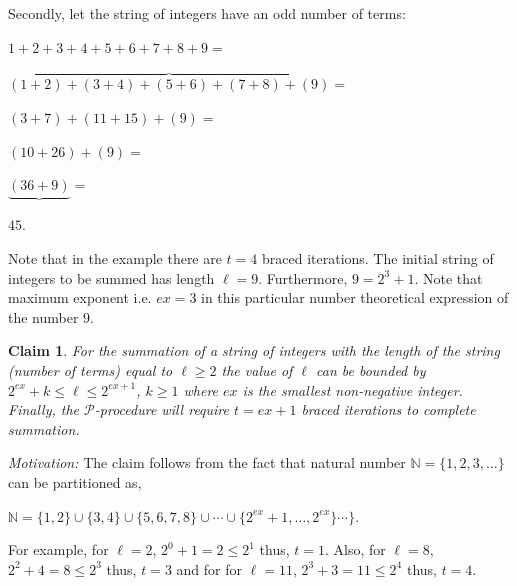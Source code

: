 \documentclass[12pt]{amsart}
\numberwithin{equation}{section}
\newtheorem{claim}[theorem]{Claim}
\numberwithin{equation}{section}
\begin{document}
Secondly, let the string of integers have an odd number of terms:
\begin{center}
$1+2+3+4+5+6+7+8+9 =$

$\overbrace{(1+2)+(3+4)+(5+6)+(7+8)+(9)} =$

$(3+7)+(11+15)+(9) =$

$(10+26)+(9) =$

$\underbrace{(36+9)} =$

$45$.
\end{center}
Note that in the example there are $t = 4$ braced iterations. The initial string of integers to be summed has length $\ell = 9$. Furthermore, $9 = 2^3 +1$. Note that maximum exponent i.e. $ex = 3$ in this particular number theoretical expression of the number $9$. 
\begin{claim}\label{clm5}
For the summation of a string of integers with the length of the string (number of terms) equal to $\ell \geq 2$ the value of $\ell$ can be bounded by $2^{ex} + k \leq \ell \leq 2^{ex+1}$, $k \geq 1$ where $ex$ is the smallest non-negative integer. Finally, the $\mathcal{P}$-procedure will require $t= ex + 1$ braced iterations to complete summation.
\end{claim}
\textit{Motivation:} The claim follows from the fact that natural number $\mathbb{N} = \{1,2,3,\dots\}$ can be partitioned as,
\begin{center}
$\mathbb{N} = \{1,2\}\cup \{3,4\}\cup \{5,6,7,8\} \cup \cdots \cup \{2^{ex}+1,\dots,2^{ex}\}\cdots\}$.
\end{center}
For example, for $\ell = 2$, $2^0 + 1 = 2 \leq 2^1$ thus, $t = 1$. Also, for $\ell = 8$, $2^2 + 4 = 8 \leq 2^3$ thus, $t = 3$ and for for $\ell = 11$, $2^3 + 3 = 11 \leq 2^4$ thus, $t = 4$.
\end{document}
